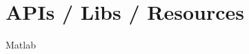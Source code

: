 \documentclass{article}
\begin{document}
\section{APIs / Libs / Resources}
Matlab



\end{document}
